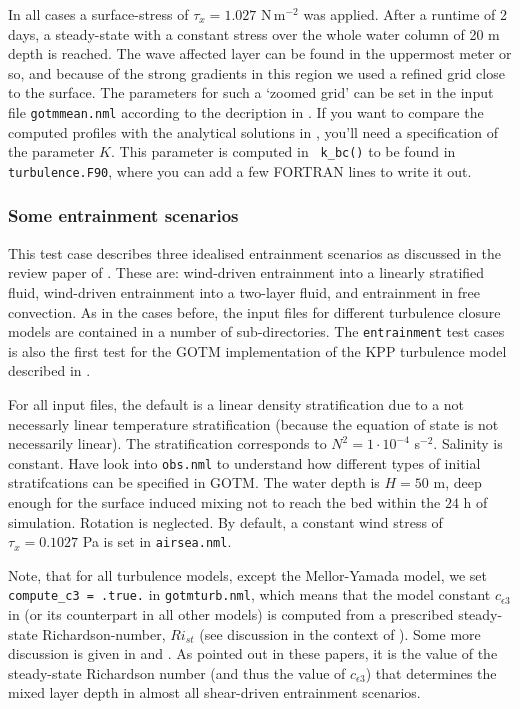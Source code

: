 In all cases a surface-stress of $\tau_x= 1.027$ N\,m$^{-2}$ was
applied. After a runtime of 2 days, a steady-state with a constant
stress over the whole water column of 20 m depth is reached. The wave
affected layer can be found in the uppermost meter or so, and because
of the strong gradients in this region we used a refined grid close to
the surface. The parameters for such a `zoomed grid' can be set in the
input file {\tt gotmmean.nml} according to the decription in
.  If you want to compare the computed profiles
with the analytical solutions in , you'll need a
specification of the parameter $K$. This parameter is computed in {\tt
k\_bc()} to be found in {\tt turbulence.F90}, where you can add a few
FORTRAN lines to write it out.

\subsubsection{Some entrainment scenarios}\label{entrainment}

This test case describes three idealised entrainment scenarios as
discussed in the review paper of \cite{UmlaufBurchard2005a}.  These
are: wind-driven entrainment into a linearly stratified fluid,
wind-driven entrainment into a two-layer fluid, and entrainment in
free convection. As in the cases before, the input files for different
turbulence closure models are contained in a number of
sub-directories.  The {\tt entrainment} test cases is also the first
test for the GOTM implementation of the KPP turbulence model described
in .

For all input files, the default is a linear density stratification
due to a not necessarly linear temperature stratification (because the
equation of state is not necessarily linear).  The stratification
corresponds to $N^2=1 \cdot 10^{-4}$ s$^{-2}$. Salinity is
constant. Have look into {\tt obs.nml} to understand how different
types of initial stratifcations can be specified in GOTM. The water
depth is $H=50$ m, deep enough for the surface induced mixing not
to reach the bed within the $24$ h of simulation. Rotation is
neglected. By default, a constant wind stress of $\tau_x= 0.1027$ Pa
is set in {\tt airsea.nml}.

Note, that for all turbulence models, except the Mellor-Yamada model,
we set {\tt compute\_c3 = .true.} in {\tt gotmturb.nml}, which means
that the model constant $c_{\epsilon 3}$ in  (or its
counterpart in all other models) is computed from a prescribed
steady-state Richardson-number, $Ri_{st}$ (see discussion in the
context of ). Some more discussion is given in
\cite{BurchardBolding2001} and \cite{UmlaufBurchard2005a}.  As pointed
out in these papers, it is the value of the steady-state Richardson
number (and thus the value of $c_{\epsilon 3}$) that determines the
mixed layer depth in almost all shear-driven entrainment scenarios.

